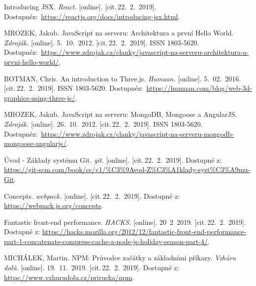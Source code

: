 \documentclass[a4paper,12pt]{article}
\begin{document}
\begin{thebibliography}{99}
Introducing JSX. 
\textit{React.} [online]. [cit.\,22.~2.~2019]. 
Dostupné\newline z:~{\ttfamily \url{https://reactjs.org/docs/introducing-jsx.html}}.

MROZEK, Jakub. JavaScript na serveru: Architektura a první Hello World.
\textit{Zdroják.} [online]. 5.~10.~2012. [cit.\,22.~2.~2019].  ISSN 1803-5620.
Dostupné\newline z:~{\ttfamily \url{https://www.zdrojak.cz/clanky/javascript-na-serveru-architektura-a-prvni-hello-world/}}.

BOTMAN, Chris. An introduction to Three.js.
\textit{Humaan.} [online]. 5.~02.~2016. [cit.\,22.~2.~2019].  ISSN 1803-5620.
Dostupné\newline z:~{\ttfamily \url{https://humaan.com/blog/web-3d-graphics-using-three-js/}}.

MROZEK, Jakub. JavaScript na serveru: MongoDB, Mongoose a AngularJS.
\textit{Zdroják.} [online]. 26.~10.~2012. [cit.\,22.~2.~2019].  ISSN 1803-5620.
Dostupné\newline z:~{\ttfamily \url{https://www.zdrojak.cz/clanky/javascript-na-serveru-mongodb-mongoose-angularjs/}}.

Úvod - Základy systému Git.
\textit{git.} [online]. [cit.\,22.~2.~2019]. 
Dostupné z: {\ttfamily \url{https://git-scm.com/book/cs/v1/%C3%9Avod-Z%C3%A1klady-syst%C3%A9mu-Git}}.

Concepts.
\textit{webpack.} [online]. [cit.\,22.~2.~2019].
Dostupné z: {\ttfamily \url{https://webpack.js.org/concepts}}.

Fantastic front-end performance.
\textit{HACKS.} [online]. 20~2~2019. [cit.\,22.~2.~2019].
Dostupné z: {\ttfamily \url{https://hacks.mozilla.org/2012/12/fantastic-front-end-performance-part-1-concatenate-compress-cache-a-node-js-holiday-season-part-4/}}.

MICHÁLEK, Martin. NPM: Průvodce začátky a základními příkazy.
\textit{Vzhůru dolů.} [online]. 19.~11.~2019. [cit.\,22.~2.~2019].
Dostupné z: {\ttfamily \url{https://www.vzhurudolu.cz/prirucka/npm}}.

\end{thebibliography}




\clearpage {} {}
\end{document}
